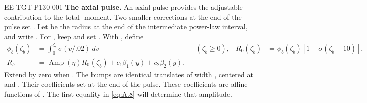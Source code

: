 %
\begin{EESegment}{EE-TGT-P130-001}
\noindent\textbf{The axial pulse.} An axial pulse provides the adjustable contribution to
the total -moment. Two smaller corrections at the end of the
pulse set . Let  be the
radius at the end of the intermediate power-law interval, and write
. For
, keep 
and set . With
, define
\[
\begin{aligned}
\phi_b(\zeta_b)&=\int_0^{\zeta_b}\sigma(v/.02)\,dv
  &&(\zeta_b\ge0),
&R_0(\zeta_b)&=\phi_b(\zeta_b)[1-\sigma(\zeta_b-10)],\\
R_b&=\operatorname{Amp}(\eta)R_0(\zeta_b)+c_1\beta_1(y)+c_2\beta_2(y).
\end{aligned}
\]
Extend  by zero when
. The bumps  are
identical translates of width , centered at
 and . Their
coefficients  set  at the
end of the pulse. These coefficients are affine functions of
. The first equality in \eqref{eq:A.8} will
determine that amplitude.
\end{EESegment}


